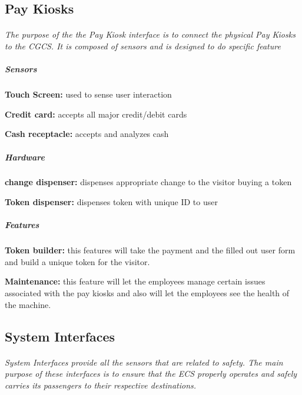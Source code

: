 \documentclass[12pt]{article}
\begin{document}
\subsection{Pay Kiosks}
	\paragraph{} \textit{The purpose of the the Pay Kiosk interface is to connect the physical Pay Kiosks to the CGCS. It is composed of sensors and is designed to do specific feature}
		\subparagraph{Sensors}
			\begin{list}{•}{•}
					\item \textbf{Touch Screen: }used to sense user interaction 
					\item \textbf{Credit card: }accepts all major credit/debit cards 
					\item \textbf{Cash receptacle: }accepts and analyzes cash 
			\end{list}
		\subparagraph{Hardware}
			\begin{list}{•}{•}
					\item \textbf{change dispenser: }dispenses appropriate change to the visitor buying a token
					\item \textbf{Token dispenser: }dispenses token with unique ID to user
			\end{list}
		\subparagraph{Features}
			\begin{list}{•}{•}
					\item \textbf{Token builder: }this features will take the payment and the filled out user form and build a unique token for the visitor.
					\item \textbf{Maintenance: }this feature will let the employees manage certain issues associated with the pay kiosks and also will let the employees see the health of the machine. 
			\end{list}





\subsection{System Interfaces}
\paragraph{} \textit{System Interfaces provide all the sensors that are related to safety. The main purpose of these interfaces is to ensure that the ECS properly operates and safely carries its passengers to their respective destinations.}
\end{document}
